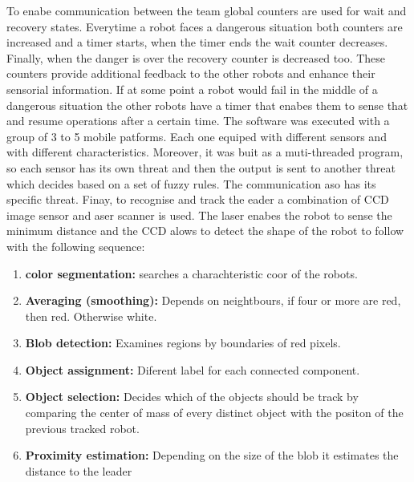 \documentclass{article}
\begin{document}
To enabe communication between the team global counters are used for wait and recovery states. Everytime a robot faces a dangerous situation both counters are increased and a timer starts, when the timer ends the wait counter decreases. Finally, when the danger is over the recovery counter is decreased too. These counters provide additional feedback to the other robots and enhance their sensorial information. If at some point a robot would fail in the middle of a dangerous situation the other robots have a timer that enabes them to sense that and resume operations after a certain time.
The software was executed with a group of 3 to 5 mobile patforms. Each one equiped with different sensors and with different characteristics.
Moreover, it was buit as a muti-threaded program, so each sensor has its own threat and then the output is sent to another threat which decides based on a set of fuzzy rules. The communication aso has its specific threat.
Finay, to recognise and track the eader a combination of CCD image sensor and aser scanner is used. The laser enabes the robot to sense the minimum distance and the CCD alows to detect the shape of the robot to follow with the following sequence:
\begin{enumerate}[1.-]
	\item \textbf{color segmentation:} searches a charachteristic coor of the robots.
	\item \textbf{Averaging (smoothing):} Depends on neightbours, if four or more are red, then red. Otherwise white.
	\item \textbf{Blob detection:} Examines regions by boundaries of red pixels.
	\item \textbf{Object assignment:} Diferent label for each connected component.
	\item \textbf{Object selection:} Decides which of the objects should be track by comparing the center of mass of every distinct object with the positon of the previous tracked robot.
	\item \textbf{Proximity estimation:} Depending on the size of the blob it estimates the distance to the leader
	
\end{enumerate}
\end{document}
